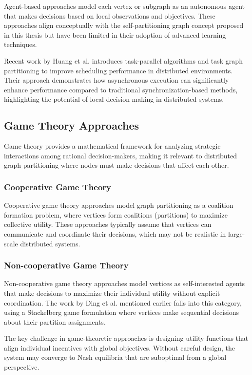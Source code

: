 \documentclass{article}
\begin{document}
Agent-based approaches model each vertex or subgraph as an autonomous agent that makes decisions based on local observations and objectives. These approaches align conceptually with the self-partitioning graph concept proposed in this thesis but have been limited in their adoption of advanced learning techniques.

Recent work by Huang et al. \cite{huang2024parallel} introduces task-parallel algorithms and task graph partitioning to improve scheduling performance in distributed environments. Their approach demonstrates how asynchronous execution can significantly enhance performance compared to traditional synchronization-based methods, highlighting the potential of local decision-making in distributed systems.

\subsection{Game Theory Approaches}

Game theory provides a mathematical framework for analyzing strategic interactions among rational decision-makers, making it relevant to distributed graph partitioning where nodes must make decisions that affect each other.

\subsubsection{Cooperative Game Theory}

Cooperative game theory approaches model graph partitioning as a coalition formation problem, where vertices form coalitions (partitions) to maximize collective utility. These approaches typically assume that vertices can communicate and coordinate their decisions, which may not be realistic in large-scale distributed systems.

\subsubsection{Non-cooperative Game Theory}

Non-cooperative game theory approaches model vertices as self-interested agents that make decisions to maximize their individual utility without explicit coordination. The work by Ding et al. \cite{ding2024play} mentioned earlier falls into this category, using a Stackelberg game formulation where vertices make sequential decisions about their partition assignments.

The key challenge in game-theoretic approaches is designing utility functions that align individual incentives with global objectives. Without careful design, the system may converge to Nash equilibria that are suboptimal from a global perspective.
\end{document}
